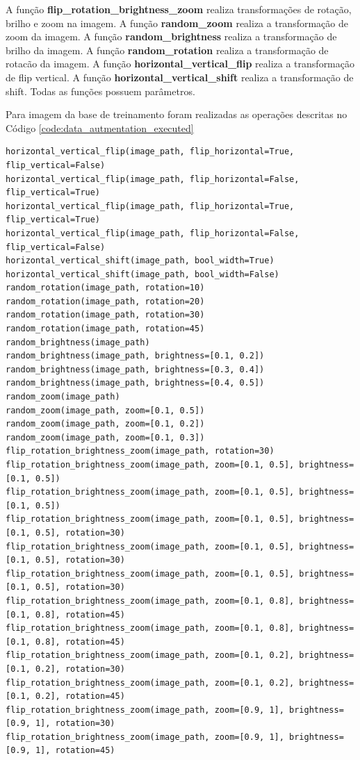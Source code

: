 \documentclass[12pt]{article}
\begin{document}
A função \textbf{flip\_rotation\_brightness\_zoom} realiza transformações de rotação, brilho e zoom na imagem. A função \textbf{random\_zoom} realiza a transformação de zoom da imagem. A função \textbf{random\_brightness} realiza a transformação de brilho da imagem. A função \textbf{random\_rotation} realiza a transformação de rotacão da imagem. A função \textbf{horizontal\_vertical\_flip} realiza a transformação de flip vertical. A função \textbf{horizontal\_vertical\_shift} realiza a transformação de shift. Todas as funções possuem parâmetros.

Para imagem da base de treinamento foram realizadas as operações descritas no Código \ref{code:data_autmentation_executed}

\begin{lstlisting}[caption={Funções Executadas},captionpos=b,frame=single,label={code:data_autmentation_executed}]
horizontal_vertical_flip(image_path, flip_horizontal=True, flip_vertical=False)
horizontal_vertical_flip(image_path, flip_horizontal=False, flip_vertical=True)
horizontal_vertical_flip(image_path, flip_horizontal=True, flip_vertical=True)
horizontal_vertical_flip(image_path, flip_horizontal=False, flip_vertical=False)
horizontal_vertical_shift(image_path, bool_width=True)
horizontal_vertical_shift(image_path, bool_width=False)
random_rotation(image_path, rotation=10)
random_rotation(image_path, rotation=20)
random_rotation(image_path, rotation=30)
random_rotation(image_path, rotation=45)
random_brightness(image_path)
random_brightness(image_path, brightness=[0.1, 0.2])
random_brightness(image_path, brightness=[0.3, 0.4])
random_brightness(image_path, brightness=[0.4, 0.5])
random_zoom(image_path)
random_zoom(image_path, zoom=[0.1, 0.5])
random_zoom(image_path, zoom=[0.1, 0.2])
random_zoom(image_path, zoom=[0.1, 0.3])
flip_rotation_brightness_zoom(image_path, rotation=30)
flip_rotation_brightness_zoom(image_path, zoom=[0.1, 0.5], brightness=[0.1, 0.5])
flip_rotation_brightness_zoom(image_path, zoom=[0.1, 0.5], brightness=[0.1, 0.5])
flip_rotation_brightness_zoom(image_path, zoom=[0.1, 0.5], brightness=[0.1, 0.5], rotation=30)
flip_rotation_brightness_zoom(image_path, zoom=[0.1, 0.5], brightness=[0.1, 0.5], rotation=30)
flip_rotation_brightness_zoom(image_path, zoom=[0.1, 0.5], brightness=[0.1, 0.5], rotation=30)
flip_rotation_brightness_zoom(image_path, zoom=[0.1, 0.8], brightness=[0.1, 0.8], rotation=45)
flip_rotation_brightness_zoom(image_path, zoom=[0.1, 0.8], brightness=[0.1, 0.8], rotation=45)
flip_rotation_brightness_zoom(image_path, zoom=[0.1, 0.2], brightness=[0.1, 0.2], rotation=30)
flip_rotation_brightness_zoom(image_path, zoom=[0.1, 0.2], brightness=[0.1, 0.2], rotation=45)
flip_rotation_brightness_zoom(image_path, zoom=[0.9, 1], brightness=[0.9, 1], rotation=30)
flip_rotation_brightness_zoom(image_path, zoom=[0.9, 1], brightness=[0.9, 1], rotation=45)
  \end{lstlisting}
\end{document}
